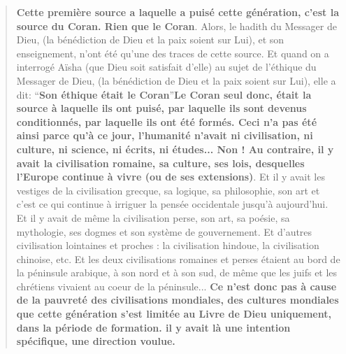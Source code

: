 \begin{quote}
\textbf{Cette première source a laquelle a puisé cette génération, c'est
la source du Coran. Rien que le Coran}. Alors, le hadith du Messager de
Dieu, (la bénédiction de Dieu et la paix soient sur Lui), et son
enseignement, n'ont été qu'une des traces de cette source. Et quand on a
interrogé Aïsha (que Dieu soit satisfait d'elle) au sujet de l'éthique
du Messager de Dieu, (la bénédiction de Dieu et la paix soient sur Lui),
elle a dit: ``\textbf{Son éthique était le Coran}''\textbf{Le Coran seul
donc, était la source à laquelle ils ont puisé, par laquelle ils sont
devenus conditionnés, par laquelle ils ont été formés. Ceci n'a pas été
ainsi parce qu'à ce jour, l'humanité n'avait ni civilisation, ni
culture, ni science, ni écrits, ni études... Non ! Au contraire, il y
avait la civilisation romaine, sa culture, ses lois, desquelles l'Europe
continue à vivre (ou de ses extensions)}. Et il y avait les vestiges de
la civilisation grecque, sa logique, sa philosophie, son art et c'est ce
qui continue à irriguer la pensée occidentale jusqu'à aujourd'hui. Et il
y avait de même la civilisation perse, son art, sa poésie, sa
mythologie, ses dogmes et son système de gouvernement. Et d'autres
civilisation lointaines et proches : la civilisation hindoue, la
civilisation chinoise, etc. Et les deux civilisations romaines et perses
étaient au bord de la péninsule arabique, à son nord et à son sud, de
même que les juifs et les chrétiens vivaient au coeur de la péninsule...
\textbf{Ce n'est donc pas à cause de la pauvreté des civilisations
mondiales, des cultures mondiales que cette génération s'est limitée au
Livre de Dieu uniquement, dans la période de formation. il y avait là
une intention spécifique, une direction voulue.}


\end{quote}
